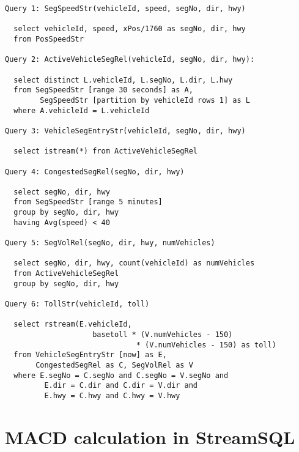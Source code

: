 \begin{lstlisting}
Query 1: SegSpeedStr(vehicleId, speed, segNo, dir, hwy)

  select vehicleId, speed, xPos/1760 as segNo, dir, hwy
  from PosSpeedStr

Query 2: ActiveVehicleSegRel(vehicleId, segNo, dir, hwy):

  select distinct L.vehicleId, L.segNo, L.dir, L.hwy
  from SegSpeedStr [range 30 seconds] as A,
        SegSpeedStr [partition by vehicleId rows 1] as L
  where A.vehicleId = L.vehicleId

Query 3: VehicleSegEntryStr(vehicleId, segNo, dir, hwy)

  select istream(*) from ActiveVehicleSegRel

Query 4: CongestedSegRel(segNo, dir, hwy)

  select segNo, dir, hwy
  from SegSpeedStr [range 5 minutes]
  group by segNo, dir, hwy
  having Avg(speed) < 40

Query 5: SegVolRel(segNo, dir, hwy, numVehicles)

  select segNo, dir, hwy, count(vehicleId) as numVehicles
  from ActiveVehicleSegRel
  group by segNo, dir, hwy

Query 6: TollStr(vehicleId, toll)

  select rstream(E.vehicleId,
                    basetoll * (V.numVehicles - 150)
                              * (V.numVehicles - 150) as toll)
  from VehicleSegEntryStr [now] as E,
       CongestedSegRel as C, SegVolRel as V
  where E.segNo = C.segNo and C.segNo = V.segNo and
         E.dir = C.dir and C.dir = V.dir and
         E.hwy = C.hwy and C.hwy = V.hwy
\end{lstlisting}


\section{MACD calculation in StreamSQL}
\label{sec:macd}

\lstset{
  language=StreamSQL,
  columns=fullflexible,
  basicstyle=\tt,
  keywordstyle=[1]\bf,
  keywordstyle=[2]\it,
}

